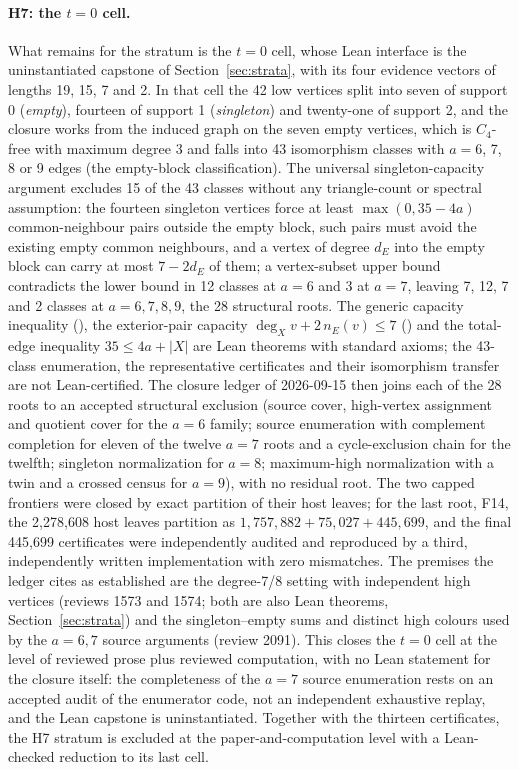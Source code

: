 \documentclass{anvil-paper}
\theoremstyle{definition}
\begin{document}
\paragraph{H7: the $t=0$ cell.} What remains for the stratum is the $t=0$ cell, whose Lean interface is the uninstantiated capstone  of Section~\ref{sec:strata}, with its four evidence vectors of lengths 19, 15, 7 and 2. In that cell the 42 low vertices split into seven of support 0 (\emph{empty}), fourteen of support 1 (\emph{singleton}) and twenty-one of support 2, and the closure works from the induced graph on the seven empty vertices, which is $C_4$-free with maximum degree 3 and falls into 43 isomorphism classes with $a=6$, 7, 8 or 9 edges (the empty-block classification). The universal singleton-capacity argument excludes 15 of the 43 classes without any triangle-count or spectral assumption: the fourteen singleton vertices force at least $\max(0,35-4a)$ common-neighbour pairs outside the empty block, such pairs must avoid the existing empty common neighbours, and a vertex of degree $d_E$ into the empty block can carry at most $7-2d_E$ of them; a vertex-subset upper bound contradicts the lower bound in 12 classes at $a=6$ and 3 at $a=7$, leaving 7, 12, 7 and 2 classes at $a=6,7,8,9$, the 28 structural roots. The generic capacity inequality (), the exterior-pair capacity $\deg_X v+2\,n_E(v)\le 7$ () and the total-edge inequality $35\le 4a+|X|$ are Lean theorems with standard axioms; the 43-class enumeration, the representative certificates and their isomorphism transfer are not Lean-certified. The closure ledger of 2026-09-15 then joins each of the 28 roots to an accepted structural exclusion (source cover, high-vertex assignment and quotient cover for the $a=6$ family; source enumeration with complement completion for eleven of the twelve $a=7$ roots and a cycle-exclusion chain for the twelfth; singleton normalization for $a=8$; maximum-high normalization with a twin and a crossed census for $a=9$), with no residual root. The two capped frontiers were closed by exact partition of their host leaves; for the last root, F14, the 2,278,608 host leaves partition as $1{,}757{,}882+75{,}027+445{,}699$, and the final 445,699 certificates were independently audited and reproduced by a third, independently written implementation with zero mismatches. The premises the ledger cites as established are the degree-7/8 setting with independent high vertices (reviews 1573 and 1574; both are also Lean theorems, Section~\ref{sec:strata}) and the singleton--empty sums and distinct high colours used by the $a=6,7$ source arguments (review 2091). This closes the $t=0$ cell at the level of reviewed prose plus reviewed computation, with no Lean statement for the closure itself: the completeness of the $a=7$ source enumeration rests on an accepted audit of the enumerator code, not an independent exhaustive replay, and the Lean capstone is uninstantiated. Together with the thirteen certificates, the H7 stratum is excluded at the paper-and-computation level with a Lean-checked reduction to its last cell.
\end{document}
